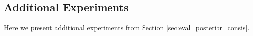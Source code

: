 \subsection{Additional Experiments}
\label{sec:UQ_BENCH_additional_experiment}
Here we present additional experiments from Section \ref{sec:eval_posterior_consis}.





  





